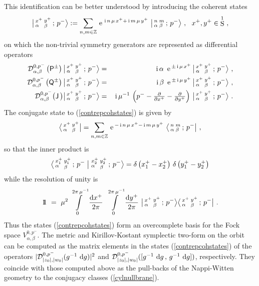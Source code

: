 \documentclass[11pt,a4paper]{article}
\DeclareMathOperator{\Sphere}{S}
\let\S\Sphere
\newcommand{\ii}{{\rm i}}
\def\ii{{\,{\rm i}\,}}
\def\dd{{\rm d}}
\def\P{{\sf P}}
\def\Q{{\sf Q}}
\def\J{{\sf J}}
\newcommand{\zed}{{\mathbb Z}} %
\newcommand{\id}{{1\!\!1}} %
\def\e{{\,\rm e}\,}
\def\bea{\begin{eqnarray}}
\def\eea{\end{eqnarray}}
\newcommand{\beq}{\begin{eqnarray}}
\newcommand{\eeq}{\end{eqnarray}}
\begin{document}
This identification can be better understood by introducing the
coherent states
\beq
\bigl|\,{}^{x^+}_\alpha\,{}^{y^+}_\beta\,;\,p^-
\bigr\rangle:=\sum_{n,m\in\zed}
\e^{\ii n\,\mu\,x^++\ii m\,\mu\,y^+}~\bigl|\,{}^n_\alpha\,{}^m_\beta
\,;\,p^-\bigr\rangle \ , ~~ x^+,y^+\in\S^1 \ ,
\label{contrepcohstates}\eeq
on which the non-trivial symmetry generators are represented as
differential operators
\bea
\mathcal{D}^{0,p^-}_{\alpha,\beta}\left(\P^\pm\right)
\bigl|\,{}^{x^+}_\alpha\,{}^{y^+}_\beta\,;\,p^-\bigr\rangle
&=&\ii\alpha~\e^{\pm\ii\mu\,x^+}\,\bigl|\,{}^{x^+}_\alpha\,{}^{y^+}_\beta
\,;\,p^-\bigr\rangle \ , \nonumber\\
\mathcal{D}^{0,p^-}_{\alpha,\beta}\left(\Q^\pm\right)
\bigl|\,{}^{x^+}_\alpha\,{}^{y^+}_\beta\,;\,p^-\bigr\rangle
&=&\ii\beta~\e^{\pm\ii\mu\,y^+}\,\bigl|\,{}^{x^+}_\alpha\,{}^{y^+}_\beta
\,;\,p^-\bigr\rangle \ , \nonumber\\
\mathcal{D}^{0,p^-}_{\alpha,\beta}\bigl(\J\,\bigr)\bigl|\,
{}^{x^+}_\alpha\,{}^{y^+}_\beta\,;\,p^-\bigr\rangle
&=&\ii\mu^{-1}\,\left(p^--\mbox{$\frac\partial{\partial x^+}-
\frac\partial{\partial y^+}$}\right)\,\bigl|\,{}^{x^+}_\alpha\,
{}^{y^+}_\beta\,;\,p^-\bigr\rangle \ .
\label{contrepcohactions}\eea
The conjugate state to (\ref{contrepcohstates}) is given by
\beq
\bigl\langle\,{}^{x^+}_\alpha\,{}^{y^+}_\beta\bigr|=\sum_{n,m\in\zed}
\e^{-\ii n\,\mu\,x^+-\ii
  m\,\mu\,y^+}~\bigl\langle\,{}^n_\alpha\,{}^m_\beta
\,;\,p^-\bigr| \ ,
\label{contrepconjstate}\eeq
so that the inner product is
\beq
\bigl\langle\,{}^{x_1^+}_\alpha\,{}^{y_1^+}_\beta\,;\,p^-
\bigm|{}^{x_2^+}_\alpha\,{}^{y_2^+}_\beta\,;\,p^-\bigr\rangle=\delta\left(
x_1^+-x_2^+\right)\,\delta\left(y_1^+-y_2^+\right)
\label{contrepinnerprod}\eeq
while the resolution of unity is
\beq
\id~=~\mu^2\,\int\limits_0^{2\pi\,\mu^{-1}}\frac{\dd x^+}{2\pi}~
\int\limits_0^{2\pi\,\mu^{-1}}\frac{\dd y^+}{2\pi}~
\bigl|\,{}^{x^+}_\alpha\,{}^{y^+}_\beta\,;\,p^-\bigr\rangle\bigl
\langle\,{}^{x^+}_\alpha\,{}^{y^+}_\beta\,;\,p^-\bigr| \ .
\label{contrepresunity}\eeq
Thus the states (\ref{contrepcohstates}) form an overcomplete basis
for the Fock space $V^{0,p^-}_{\alpha,\beta}$. The metric
and Kirillov-Kostant symplectic two-form on the orbit can be computed
as the matrix elements in the states (\ref{contrepcohstates}) of the
operators $|\mathcal{D}_{|z_0|,|w_0|}^{0,p^-}(g^{-1}~\dd g)|^2$ and
$\mathcal{D}_{|z_0|,|w_0|}^{0,p^-}([g^{-1}~\dd g\,,\,g^{-1}~\dd g])$,
respectively. They coincide with those computed above as the
pull-backs of the Nappi-Witten geometry to the conjugacy classes
(\ref{cylnullbrane}).
\end{document}
